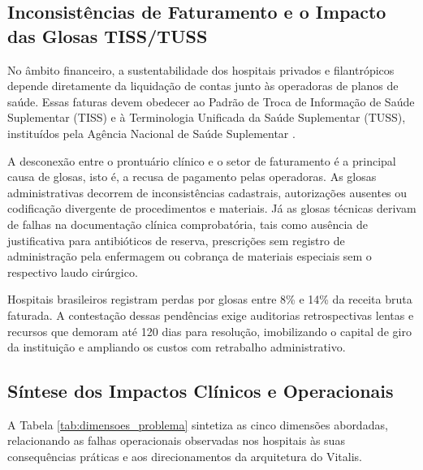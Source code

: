\subsection{Inconsistências de Faturamento e o Impacto das Glosas TISS/TUSS}

No âmbito financeiro, a sustentabilidade dos hospitais privados e filantrópicos depende diretamente da liquidação de contas junto às operadoras de planos de saúde. Essas faturas devem obedecer ao Padrão de Troca de Informação de Saúde Suplementar (TISS) e à Terminologia Unificada da Saúde Suplementar (TUSS), instituídos pela Agência Nacional de Saúde Suplementar \cite{ans_tiss:2023}.

A desconexão entre o prontuário clínico e o setor de faturamento é a principal causa de glosas, isto é, a recusa de pagamento pelas operadoras. As glosas administrativas decorrem de inconsistências cadastrais, autorizações ausentes ou codificação divergente de procedimentos e materiais. Já as glosas técnicas derivam de falhas na documentação clínica comprobatória, tais como ausência de justificativa para antibióticos de reserva, prescrições sem registro de administração pela enfermagem ou cobrança de materiais especiais sem o respectivo laudo cirúrgico.

Hospitais brasileiros registram perdas por glosas entre 8\% e 14\% da receita bruta faturada. A contestação dessas pendências exige auditorias retrospectivas lentas e recursos que demoram até 120 dias para resolução, imobilizando o capital de giro da instituição e ampliando os custos com retrabalho administrativo.

\subsection{Síntese dos Impactos Clínicos e Operacionais}

A Tabela \ref{tab:dimensoes_problema} sintetiza as cinco dimensões abordadas, relacionando as falhas operacionais observadas nos hospitais às suas consequências práticas e aos direcionamentos da arquitetura do Vitalis.

